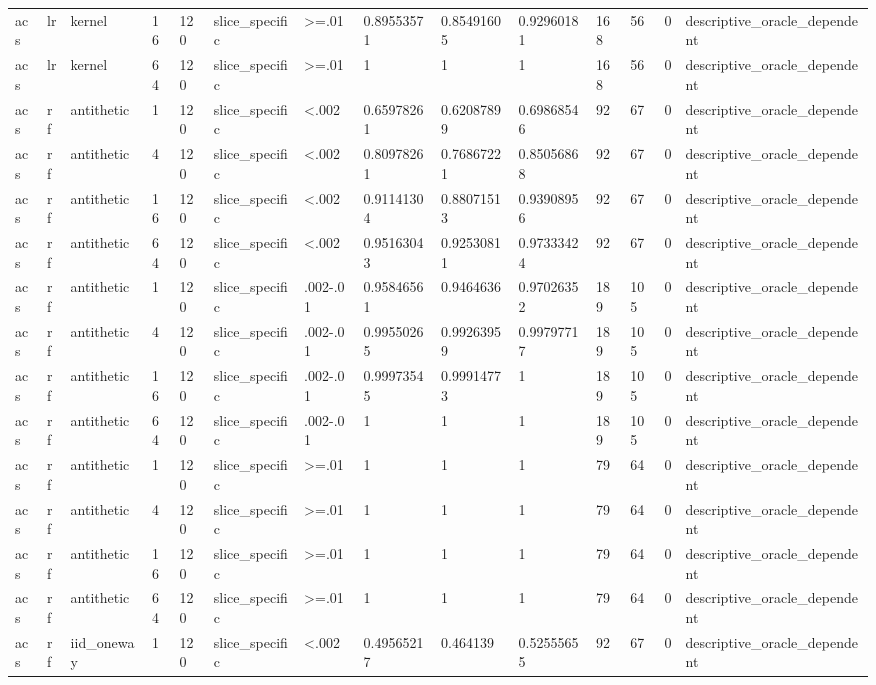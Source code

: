 \begin{tabular}{llllllllllllll}
acs & lr & kernel & 16 & 120 & slice\_specific & >=.01 & 0.89553571 & 0.85491605 & 0.92960181 & 168 & 56 & 0 & descriptive\_oracle\_dependent \\
acs & lr & kernel & 64 & 120 & slice\_specific & >=.01 & 1 & 1 & 1 & 168 & 56 & 0 & descriptive\_oracle\_dependent \\
acs & rf & antithetic & 1 & 120 & slice\_specific & <.002 & 0.65978261 & 0.62087899 & 0.69868546 & 92 & 67 & 0 & descriptive\_oracle\_dependent \\
acs & rf & antithetic & 4 & 120 & slice\_specific & <.002 & 0.80978261 & 0.76867221 & 0.85056868 & 92 & 67 & 0 & descriptive\_oracle\_dependent \\
acs & rf & antithetic & 16 & 120 & slice\_specific & <.002 & 0.91141304 & 0.88071513 & 0.93908956 & 92 & 67 & 0 & descriptive\_oracle\_dependent \\
acs & rf & antithetic & 64 & 120 & slice\_specific & <.002 & 0.95163043 & 0.92530811 & 0.97333424 & 92 & 67 & 0 & descriptive\_oracle\_dependent \\
acs & rf & antithetic & 1 & 120 & slice\_specific & .002-.01 & 0.95846561 & 0.9464636 & 0.97026352 & 189 & 105 & 0 & descriptive\_oracle\_dependent \\
acs & rf & antithetic & 4 & 120 & slice\_specific & .002-.01 & 0.99550265 & 0.99263959 & 0.99797717 & 189 & 105 & 0 & descriptive\_oracle\_dependent \\
acs & rf & antithetic & 16 & 120 & slice\_specific & .002-.01 & 0.99973545 & 0.99914773 & 1 & 189 & 105 & 0 & descriptive\_oracle\_dependent \\
acs & rf & antithetic & 64 & 120 & slice\_specific & .002-.01 & 1 & 1 & 1 & 189 & 105 & 0 & descriptive\_oracle\_dependent \\
acs & rf & antithetic & 1 & 120 & slice\_specific & >=.01 & 1 & 1 & 1 & 79 & 64 & 0 & descriptive\_oracle\_dependent \\
acs & rf & antithetic & 4 & 120 & slice\_specific & >=.01 & 1 & 1 & 1 & 79 & 64 & 0 & descriptive\_oracle\_dependent \\
acs & rf & antithetic & 16 & 120 & slice\_specific & >=.01 & 1 & 1 & 1 & 79 & 64 & 0 & descriptive\_oracle\_dependent \\
acs & rf & antithetic & 64 & 120 & slice\_specific & >=.01 & 1 & 1 & 1 & 79 & 64 & 0 & descriptive\_oracle\_dependent \\
acs & rf & iid\_oneway & 1 & 120 & slice\_specific & <.002 & 0.49565217 & 0.464139 & 0.52555655 & 92 & 67 & 0 & descriptive\_oracle\_dependent \\

\end{tabular}
